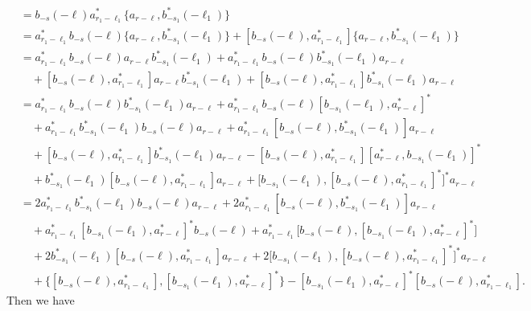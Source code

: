 \documentclass[sn-mathphys, Numbered ,a4paper]{sn-jnl}%
\theoremstyle{plain}
\theoremstyle{definition}
\theoremstyle{remark}
\theoremstyle{plain}
\theoremstyle{definition}
\theoremstyle{remark}
\begin{document}
\begin{align}
    &= 
    b_{-s}(-\ell)a^*_{  r_1-\ell_1}\{a_{ r-\ell}, b^*_{-s_1}(-\ell_1)\}\nonumber\\
    &= a^*_{  r_1-\ell_1}b_{-s}(-\ell)\{a_{ r-\ell}, b^*_{-s_1}(-\ell_1)\} + [b_{-s}(-\ell),a^*_{  r_1-\ell_1}]\{a_{ r-\ell}, b^*_{-s_1}(-\ell_1)\} \nonumber\\
    &= a^*_{  r_1-\ell_1}b_{-s}(-\ell)a_{ r-\ell} b^*_{-s_1}(-\ell_1) + a^*_{  r_1-\ell_1}b_{-s}(-\ell)b^*_{-s_1}(-\ell_1)a_{ r-\ell}\nonumber\\ &\quad + [b_{-s}(-\ell),a^*_{  r_1-\ell_1}]a_{ r-\ell}b^*_{-s_1}(-\ell_1) +[b_{-s}(-\ell),a^*_{r_1-\ell_1}] b^*_{-s_1}(-\ell_1)a_{ r-\ell}\nonumber\\
    &= a^*_{  r_1-\ell_1}b_{-s}(-\ell)b^*_{-s_1}(-\ell_1)a_{ r-\ell} + a^*_{  r_1-\ell_1}b_{-s}(-\ell)[ b_{-s_1}(-\ell_1), a^*_{ r-\ell}]^*  \nonumber\\ 
    &\quad + a^*_{  r_1-\ell_1}b^*_{-s_1}(-\ell_1)b_{-s}(-\ell)a_{ r-\ell} +a^*_{  r_1-\ell_1}[b_{-s}(-\ell),b^*_{-s_1}(-\ell_1)]a_{ r-\ell}\nonumber\\ &\quad + [b_{-s}(-\ell),a^*_{  r_1-\ell_1}]b^*_{-s_1}(-\ell_1)a_{ r-\ell} - [b_{-s}(-\ell),a^*_{  r_1-\ell_1}][a^*_{ r-\ell}, b_{-s_1}(-\ell_1)]^*\nonumber\\ &\quad +b^*_{-s_1}(-\ell_1)[b_{-s}(-\ell),a^*_{  r_1-\ell_1}]a_{ r-\ell}+ \big[b_{-s_1}(-\ell_1),[b_{-s}(-\ell),a^*_{  r_1-\ell_1}]^*\big]^*a_{ r-\ell}\nonumber\\
    &= 2a^*_{  r_1-\ell_1}b^*_{-s_1}(-\ell_1)b_{-s}(-\ell)a_{ r-\ell} + 2a^*_{  r_1-\ell_1}[b_{-s}(-\ell),b^*_{-s_1}(-\ell_1)]a_{ r-\ell}\nonumber\\ 
    &\quad + a^*_{r_1-\ell_1}[b_{-s_1}(-\ell_1),a^*_{ r-\ell}]^*b_{-s}(-\ell) + a^*_{  r_1-\ell_1}\big[b_{-s}(-\ell),[b_{-s_1}(-\ell_1),a^*_{ r-\ell}]^*\big]\nonumber\\
    &\quad + 2b^*_{-s_1}(-\ell_1)[b_{-s}(-\ell),a^*_{  r_1-\ell_1}]a_{ r-\ell} +2\big[b_{-s_1}(-\ell_1),[b_{-s}(-\ell),a^*_{  r_1-\ell_1}]^*\big]^*a_{ r-\ell}\nonumber\\
    &\quad + \big\{ [b_{-s}(-\ell),a^*_{  r_1-\ell_1}],[b_{-s_1}(-\ell_1), a^*_{ r-\ell}]^* \big\} - [ b_{-s_1}(-\ell_1), a^*_{ r-\ell}]^* [b_{-s}(-\ell), a^*_{r_1-\ell_1}].
\end{align}
Then we have
\end{document}
